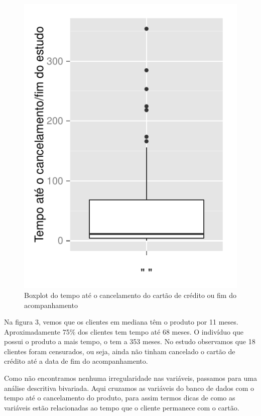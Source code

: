 \documentclass{article}\usepackage[]{graphicx}\usepackage[]{color}
\makeatletter
\def\maxwidth{ %
  \ifdim\Gin@nat@width>\linewidth
    \linewidth
  \else
    \Gin@nat@width
  \fi
}
\newenvironment{knitrout}{}{} %
\makeatother
\begin{document}
\begin{figure}[t!]

\centering
\begin{knitrout}
\color{fgcolor}
\includegraphics[width=\maxwidth]{figure/unnamed-chunk-4} 

\end{knitrout}
\caption{Boxplot do tempo até o cancelamento do cartão de crédito ou fim do acompanhamento}
\end{figure}

Na figura 3, vemos que os clientes em mediana têm o produto por 11 meses. Aproximadamente 75\% dos clientes tem tempo até 68 meses. O indivíduo que possui o produto a mais tempo, o tem a 353 meses. No estudo observamos que 18 clientes foram censurados, ou seja, ainda não tinham cancelado o cartão de crédito até a data de fim do acompanhamento.

Como não encontramos nenhuma irregularidade nas variáveis, passamos para uma análise descritiva bivariada. Aqui cruzamos as variáveis do banco de dados com o tempo até o cancelamento do produto, para assim termos dicas de como as variáveis estão relacionadas ao tempo que o cliente permanece com o cartão.
\end{document}
